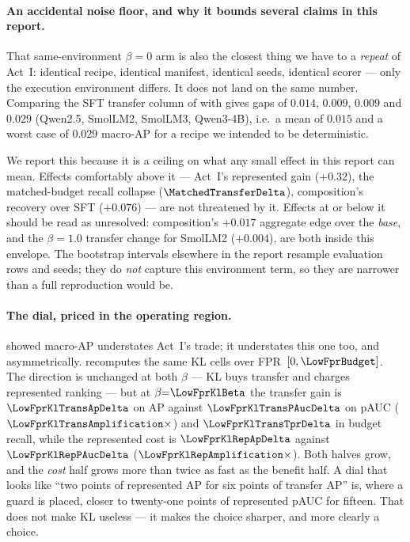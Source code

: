 \paragraph{An accidental noise floor, and why it bounds several claims in this report.} That
same-environment $\beta=0$ arm is also the closest thing we have to a \emph{repeat} of Act~I: identical
recipe, identical manifest, identical seeds, identical scorer --- only the execution environment differs.
It does not land on the same number. Comparing the SFT transfer column of  with
 gives gaps of $0.014$, $0.009$, $0.009$ and $0.029$ (Qwen2.5, SmolLM2, SmolLM3,
Qwen3-4B), i.e.\ a mean of $0.015$ and a worst case of $0.029$ macro-AP for a recipe we intended to be
deterministic.

We report this because it is a ceiling on what any small effect in this report can mean. Effects
comfortably above it --- Act~I's represented gain ($+0.32$), the matched-budget recall collapse
($\MatchedTransferDelta$), composition's recovery over SFT ($+0.076$) --- are not threatened by it.
Effects at or below it should be read as unresolved: composition's $+0.017$ aggregate edge over the
\emph{base}, and the $\beta=1.0$ transfer change for SmolLM2 ($+0.004$), are both inside this envelope.
The bootstrap intervals elsewhere in the report resample evaluation rows and seeds; they do \emph{not}
capture this environment term, so they are narrower than a full reproduction would be.

\paragraph{The dial, priced in the operating region.}  showed macro-AP
understates Act~I's trade; it understates this one too, and asymmetrically.
 recomputes the same KL cells over FPR~$[0,\LowFprBudget]$. The direction is
unchanged at both $\beta$ --- KL buys transfer and charges represented ranking --- but at
$\beta{=}\LowFprKlBeta$ the transfer gain is $\LowFprKlTransApDelta$ on AP against
$\LowFprKlTransPAucDelta$ on pAUC ($\LowFprKlTransAmplification\times$) and
$\LowFprKlTransTprDelta$ in budget recall, while the represented cost is $\LowFprKlRepApDelta$
against $\LowFprKlRepPAucDelta$ ($\LowFprKlRepAmplification\times$). Both halves grow, and the
\emph{cost} half grows more than twice as fast as the benefit half. A dial that looks like
``two points of represented AP for six points of transfer AP'' is, where a guard is placed, closer
to twenty-one points of represented pAUC for fifteen. That does not make KL useless --- it makes the
choice sharper, and more clearly a choice.

